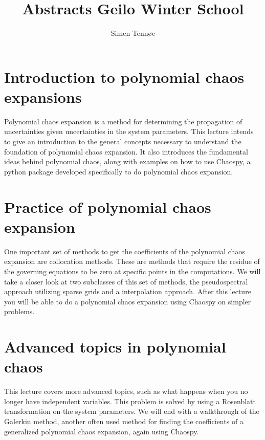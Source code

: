 \documentclass[a4paper,10pt]{article}
\title{Abstracts Geilo Winter School}
\author{Simen Tennøe}
\begin{document}
\maketitle
\newpage


\section{Introduction to polynomial chaos expansions}
Polynomial chaos expansion is a method for determining the propagation of uncertainties given uncertainties in the system parameters. This lecture intends to give an introduction to the general concepts necessary to understand the foundation of polynomial chaos expansion. It also introduces the fundamental ideas behind polynomial chaos, along with examples on how to use Chaospy, a python package developed specifically to do polynomial chaos expansion.




\section{Practice of polynomial chaos expansion}
One important set of methods to get the coefficients of the polynomial chaos expansion are collocation methods. These are methods that require the residue of the governing equations to be zero at specific points in the computations. We will take a closer look at two subclasses of this set of methods, the pseudospectral approach utilizing sparse grids and a interpolation approach.
After this lecture you will be able to do a polynomial chaos expansion using Chaospy on simpler problems.




\section{Advanced topics in polynomial chaos}
This lecture covers more advanced topics, such as what happens when you no longer have independent variables. This problem is solved by using a Rosenblatt transformation on the system parameters. %
We will end with a walkthrough of the Galerkin method, another often used method for finding the coefficients of a generalized polynomial chaos expansion, again using Chaospy.
\end{document}
